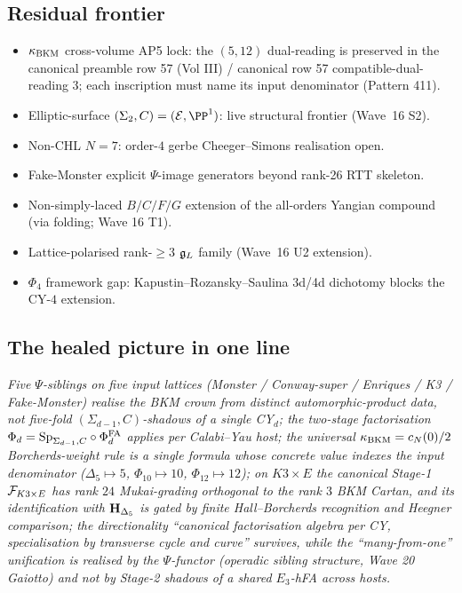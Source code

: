\subsection{Residual frontier}
\label{wn:subsec:healed-frontier}

\begin{itemize}
\item $\kappa_{\mathrm{BKM}}$ cross-volume AP5 lock: the $(5, 12)$ dual-reading is preserved in the canonical preamble row 57 (Vol III) / canonical row 57 compatible-dual-reading 3; each inscription must name its input denominator (Pattern 411).
\item Elliptic-surface $(\Sigma_2, C) = (\mathcal E, \PP^1)$: live structural frontier (Wave~16 S2).
\item Non-CHL $N = 7$: order-$4$ gerbe Cheeger--Simons realisation open.
\item Fake-Monster explicit $\Psi$-image generators beyond rank-26 RTT skeleton.
\item Non-simply-laced $B/C/F/G$ extension of the all-orders Yangian compound (via folding; Wave 16 T1).
\item Lattice-polarised rank-$\geq 3$ $\mathfrak{g}_L$ family (Wave~16 U2 extension).
\item $\Phi_4$ framework gap: Kapustin--Rozansky--Saulina 3d/4d dichotomy blocks the CY-$4$ extension.
\end{itemize}

\subsection{The healed picture in one line}
\label{wn:subsec:healed-one-line}

\emph{Five $\Psi$-siblings on five input lattices (Monster / Conway-super / Enriques / K3 / Fake-Monster) realise the BKM crown from distinct automorphic-product data, not five-fold $(\Sigma_{d-1}, C)$-shadows of a single CY$_d$; the two-stage factorisation $\Phi_d = \mathrm{Sp}_{\Sigma_{d-1}, C} \circ \Phi^{\mathrm{FA}}_d$ applies per Calabi--Yau host; the universal $\kappa_{\mathrm{BKM}} = c_N(0)/2$ Borcherds-weight rule is a single formula whose concrete value indexes the input denominator ($\Delta_5 \mapsto 5$, $\Phi_{10} \mapsto 10$, $\Phi_{12} \mapsto 12$); on $K3 \times E$ the canonical Stage-1 $\mathcal{F}_{K3 \times E}$ has rank $24$ Mukai-grading orthogonal to the rank $3$ BKM Cartan, and its identification with $\mathbf{H}_{\Delta_5}$ is gated by finite Hall--Borcherds recognition and Heegner comparison; the directionality ``canonical factorisation algebra per CY, specialisation by transverse cycle and curve'' survives, while the ``many-from-one'' unification is realised by the $\Psi$-functor (operadic sibling structure, Wave 20 Gaiotto) and not by Stage-2 shadows of a shared $E_3$-hFA across hosts.}
